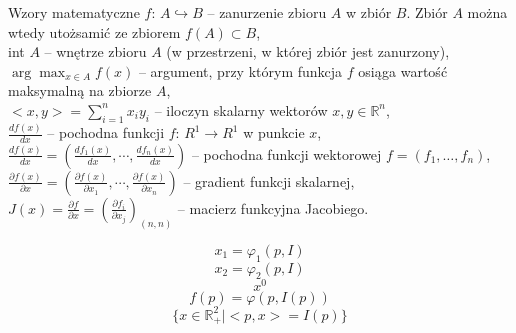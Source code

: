 \documentclass[a4paper, 11pt]{beamer}
\begin{document}
  \begin{frame}{Wzory matematyczne}{}
    {\color{blue}$f: \, A \hookrightarrow B$} -- zanurzenie zbioru $A$ w zbiór $B$. Zbiór $A$
    można wtedy utożsamić ze zbiorem $f(A) \subset B$,\\

    {\color{blue}int $A$} -- wnętrze zbioru $A$ (w przestrzeni, w której zbiór
    jest zanurzony),\\

    {\color{blue}$\arg \max_{x \in A} f(x)$} -- argument, przy którym funkcja
    $f$ osiąga wartość maksymalną na zbiorze $A$,\\

    {\color{blue}$<x, y> = \sum_{i=1}^n x_i y_i$} -- iloczyn skalarny wektorów
    $x, y \in \mathbb{R}^n$,\\

    {\color{blue}$\frac{df(x)}{dx}$} -- pochodna funkcji $f: \, R^1 \to R^1$ w
    punkcie $x$,\\

    {\color{blue}$\frac{df(x)}{dx}=\left( \frac{df_1(x)}{dx}, \cdots ,
    \frac{df_n(x)}{dx}\right )$} -- pochodna funkcji wektorowej $f=(f_1, \ldots
    , f_n)$,\\
    
    {\color{blue}$\frac{\partial f(x)}{\partial x}=\left( \frac{\partial f(x)}{\partial
    x_1}, \cdots , \frac{\partial f(x)}{\partial x_n} \right )$} -- gradient
    funkcji skalarnej,\\
    
    {\color{blue}$J(x) = \frac{\partial f}{\partial x} = \left( \frac{\partial
    f_i}{\partial x_j}\right)_{(n, n)}$} -- macierz funkcyjna
    Jacobiego.

  \end{frame}

  \begin{frame}{}
    $$x_1=\varphi_1(p, I)$$
    $$x_2=\varphi_2(p, I)$$
    $$x^0$$
    $$f(p)=\varphi(p, I(p))$$
    $$\{x \in \mathbb{R}_{+}^2 | <p, x> = I(p)\}$$
  \end{frame}
\end{document}
